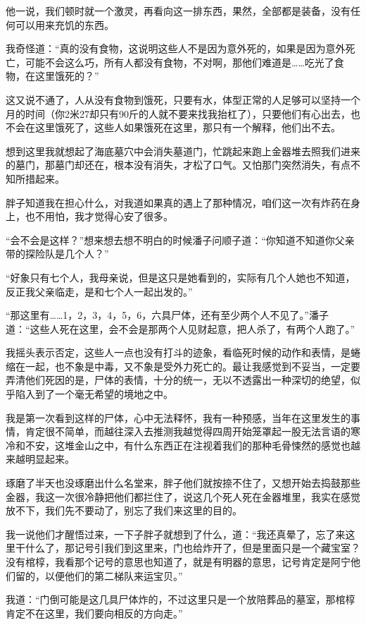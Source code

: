 他一说，我们顿时就一个激灵，再看向这一排东西，果然，全部都是装备，没有任何可以用来充饥的东西。

我奇怪道：“真的没有食物，这说明这些人不是因为意外死的，如果是因为意外死亡，可能不会这么巧，所有人都没有食物，不对啊，那他们难道是……吃光了食物，在这里饿死的？”

这又说不通了，人从没有食物到饿死，只要有水，体型正常的人足够可以坚持一个月的时间（你2米27却只有90斤的人就不要来找我抬杠了），只要他们有心出去，也不会在这里饿死了，这些人如果饿死在这里，那只有一个解释，他们出不去。

想到这里我就想起了海底墓穴中会消失墓道门，忙跳起来跑上金器堆去照我们进来的墓门，那墓门却还在，根本没有消失，才松了口气。又怕那门突然消失，有点不知所措起来。

胖子知道我在担心什么，对我道如果真的遇上了那种情况，咱们这一次有炸药在身上，也不用怕，我才觉得心安了很多。

“会不会是这样？”想来想去想不明白的时候潘子问顺子道：“你知道不知道你父亲带的探险队是几个人？”

“好象只有七个人，我母亲说，但是这只是她看到的，实际有几个人她也不知道，反正我父亲临走，是和七个人一起出发的。”

“那这里有……1，2，3，4，5，6，六具尸体，还有至少两个人不见了。”潘子道：“这些人死在这里，会不会是那两个人见财起意，把人杀了，有两个人跑了。”

我摇头表示否定，这些人一点也没有打斗的迹象，看临死时候的动作和表情，是蜷缩在一起，也不象是中毒，又不象是受外力死亡的。最让我感觉到不妥当，一定要弄清他们死因的是，尸体的表情，十分的统一，无以不透露出一种深切的绝望，似乎陷入到了一个毫无希望的境地之中。

我是第一次看到这样的尸体，心中无法释怀，我有一种预感，当年在这里发生的事情，肯定很不简单，而越往深入去推测我越觉得四周开始笼罩起一股无法言语的寒冷和不安，这堆金山之中，有什么东西正在注视着我们的那种毛骨悚然的感觉也越来越明显起来。

琢磨了半天也没琢磨出什么名堂来，胖子他们就按捺不住了，又想开始去捣鼓那些金器，我这一次很冷静把他们都拦住了，说这几个死人死在金器堆里，我实在感觉放不下，我们先不要动了，别忘了我们来这里的目的。

我一说他们才醒悟过来，一下子胖子就想到了什么，道：“我还真晕了，忘了来这里干什么了，那记号引我们到这里来，门也给炸开了，但是里面只是一个藏宝室？没有棺椁，我看那个记号的意思也知道了，就是有明器的意思，记号肯定是阿宁他们留的，以便他们的第二梯队来运宝贝。”

我道：“门倒可能是这几具尸体炸的，不过这里只是一个放陪葬品的墓室，那棺椁肯定不在这里，我们要向相反的方向走。”

